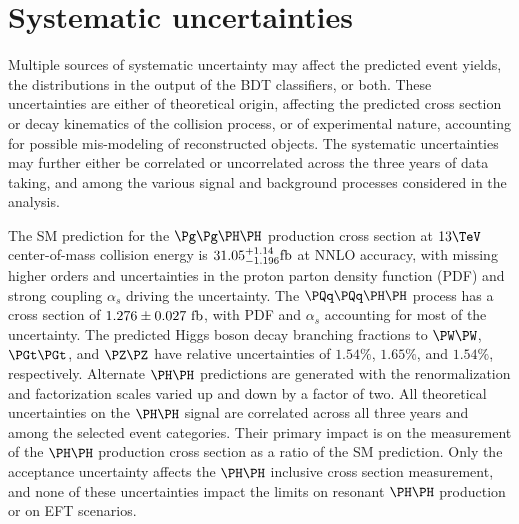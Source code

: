 \section{Systematic uncertainties}
\label{sec:systematicUncertainties}

Multiple sources of systematic uncertainty may affect
the predicted event yields, the distributions in the output of the BDT classifiers, or both.
These uncertainties are either of theoretical origin, affecting the predicted cross
section or decay kinematics of the collision process, or of experimental nature,
accounting for possible mis-modeling of reconstructed objects.
The systematic uncertainties may further either be correlated or
uncorrelated across the three years of data taking, and among the
various signal and background processes considered in the analysis.

The SM prediction for the $\ggHH$ production cross
section at $13\TeV$ center-of-mass collision energy is
$31.05^{+1.14}_{-1.196}\text{fb}$ at NNLO accuracy, with missing higher
orders and uncertainties in the proton parton density function (PDF)
and strong coupling $\alpha_{s}$ driving the uncertainty. %
The $\qqHH$ process has a cross section of $1.276\pm0.027~\text{fb}$,
with PDF and $\alpha_{s}$ accounting for most of the uncertainty. %
The predicted Higgs boson decay branching fractions to $\PW\PW$,
$\PGt\PGt$, and $\PZ\PZ$ have relative uncertainties of $1.54\%$,
$1.65\%$, and $1.54\%$, respectively. %
Alternate $\HH$ predictions are generated with the renormalization
and factorization scales varied up and down by a factor of two.
All theoretical uncertainties on the $\HH$ signal are correlated
across all three years and among the selected event categories.
Their primary impact is on the measurement of the $\HH$ production
cross section as a ratio of the SM prediction.
Only the acceptance uncertainty affects the $\HH$ inclusive cross
section measurement, and none of these uncertainties impact the
limits on resonant $\HH$ production or on EFT scenarios.

